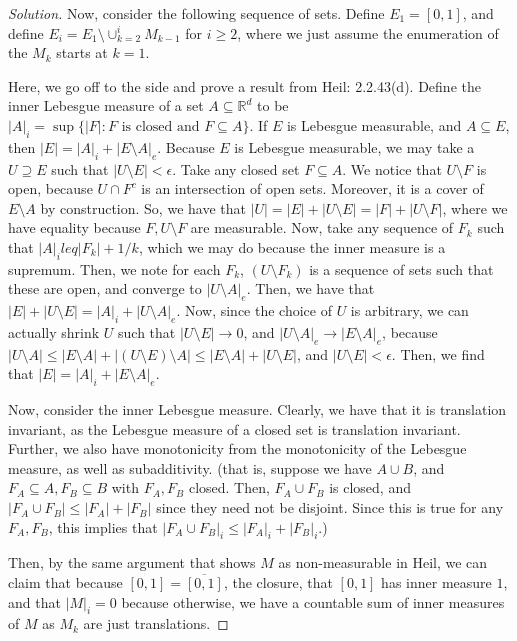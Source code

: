 \documentclass[10pt]{article}
\begin{document}
\begin{proof}[Solution]
Now, consider the following sequence of sets. Define $E_1 = [0,1]$, and define $E_i = E_{1} \setminus \cup_{k=2}^i M_{k-1}$ for $i \geq 2$, where we just assume the enumeration of the $M_k$ starts at $k=1$. 

Here, we go off to the side and prove a result from Heil: 2.2.43(d). Define the inner Lebesgue measure of a set $A \subseteq \mathbb{R}^d$ to be $|A|_i = \sup \{ |F| : F \text{ is closed and } F \subseteq A \}$. If $E$ is Lebesgue measurable, and $A \subseteq E$, then $|E| = |A|_i + |E \setminus A|_e$. Because $E$ is Lebesgue measurable, we may take a $U \supseteq E$ such that $|U \setminus E| < \epsilon$. Take any closed set $F \subseteq A$. We notice that $U \setminus F$ is open, because $U \cap F^c$ is an intersection of open sets. Moreover, it is a cover of $E \setminus A$ by construction. So, we have that $|U| = |E| + |U\setminus E| = |F| + |U \setminus F|$, where we have equality because $F, U \setminus F$ are measurable. Now, take any sequence of $F_k$ such that $|A|_i leq |F_k| + 1/k$, which we may do because the inner measure is a supremum. Then, we note for each $F_k$, $(U\setminus F_k)$ is a sequence of sets such that these are open, and converge to $|U \setminus A|_e$. Then, we have that $|E| + |U \setminus E| = |A|_i + |U \setminus A|_e$. Now, since the choice of $U$ is arbitrary, we can actually shrink $U$ such that $|U \setminus E| \to 0$, and $|U \setminus A|_e \to |E \setminus A|_e$, because $|U \setminus A | \leq |E \setminus A| + |(U \setminus E) \setminus A| \leq |E \setminus A| + |U \setminus E|$, and $| U \setminus E| < \epsilon$. Then, we find that $|E| = |A|_i + |E \setminus A|_e$.

Now, consider the inner Lebesgue measure. Clearly, we have that it is translation invariant, as the Lebesgue measure of a closed set is translation invariant. Further, we also have monotonicity from the monotonicity of the Lebesgue measure, as well as subadditivity. (that is, suppose we have $A \cup B$, and $F_A \subseteq A, F_B \subseteq B$ with $F_A, F_B$ closed. Then, $F_A \cup F_B$ is closed, and $|F_A \cup F_B| \leq |F_A| + |F_B|$ since they need not be disjoint. Since this is true for any $F_A, F_B$, this implies that $|F_A \cup F_B|_i \leq |F_A|_i + |F_B|_i$.)

Then, by the same argument that shows $M$ as non-measurable in Heil, we can claim that because $[0,1] = \overline{[0,1]}$, the closure, that $[0,1]$ has inner measure $1$, and that $|M|_i = 0$ because otherwise, we have a countable sum of inner measures of $M$ as $M_k$ are just translations.


\end{proof}
\end{document}
